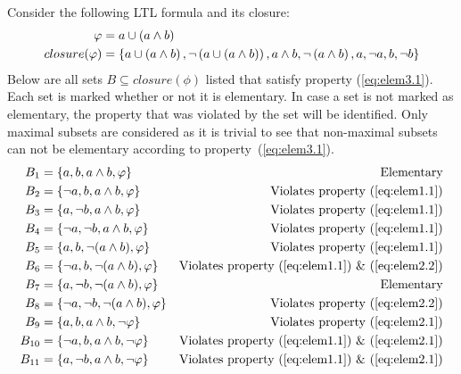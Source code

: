 \begin{example}
Consider the following LTL formula and its closure:
\begin{align*}
    \varphi &= a \cup \left( a \land b \right) \\
    closure(\varphi) &= \left\{ a \cup \left( a \land b \right), \lnot \left( a \cup \left( a \land b \right) \right), a \land b, \lnot \left( a \land b \right), a, \lnot a, b, \lnot b \right\}
\end{align*}
Below are all sets $B \subseteq closure(\phi)$ listed that satisfy property (\ref{eq:elem3.1}). Each set is marked whether or not it is elementary. In case a set is not marked as elementary, the property that was violated by the set will be identified. Only maximal subsets are considered as it is trivial to see that non-maximal subsets can not be elementary according to property~(\ref{eq:elem3.1}).
\begin{align*}
    B_1    &= \left\{ a,       b,       a\land b,         \phi       \right\} &\text{Elementary} \\
    B_2    &= \left\{ \lnot a, b,       a\land b,         \phi       \right\} &\text{Violates property (\ref{eq:elem1.1})} \\
    B_3    &= \left\{ a,       \lnot b, a\land b,         \phi       \right\} &\text{Violates property (\ref{eq:elem1.1})} \\
    B_4    &= \left\{ \lnot a, \lnot b, a\land b,         \phi       \right\} &\text{Violates property (\ref{eq:elem1.1})} \\
    B_5    &= \left\{ a,       b,       \lnot (a\land b), \phi       \right\} &\text{Violates property (\ref{eq:elem1.1})} \\
    B_6    &= \left\{ \lnot a, b,       \lnot (a\land b), \phi       \right\} &\text{Violates property (\ref{eq:elem1.1}) \& (\ref{eq:elem2.2})} \\
    B_7    &= \left\{ a,       \lnot b, \lnot (a\land b), \phi       \right\} &\text{Elementary} \\
    B_8    &= \left\{ \lnot a, \lnot b, \lnot (a\land b), \phi       \right\} &\text{Violates property (\ref{eq:elem2.2})} \\
    B_9    &= \left\{ a,       b,       a\land b,         \lnot \phi \right\} &\text{Violates property (\ref{eq:elem2.1})} \\
    B_{10} &= \left\{ \lnot a, b,       a\land b,         \lnot \phi \right\} &\text{Violates property (\ref{eq:elem1.1}) \& (\ref{eq:elem2.1})} \\
    B_{11} &= \left\{ a,       \lnot b, a\land b,         \lnot \phi \right\} &\text{Violates property (\ref{eq:elem1.1}) \& (\ref{eq:elem2.1})} \\

\end{align*}
\end{example}
